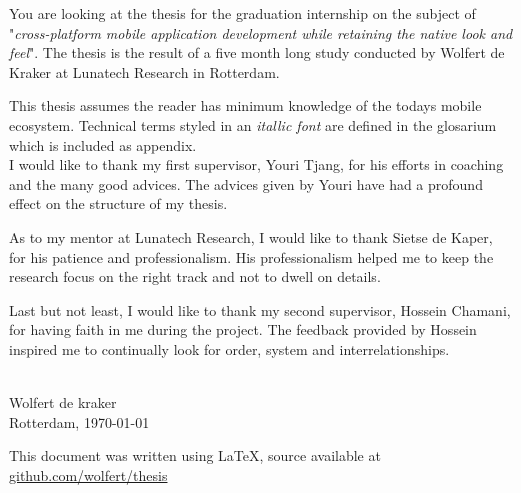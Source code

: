 
You are looking at the thesis for the graduation internship on the subject of "\emph{cross-platform mobile application development while retaining the native look and feel}". The thesis is the result of a five month long study conducted by Wolfert de Kraker at Lunatech Research in Rotterdam.

This thesis assumes the reader has minimum knowledge of the todays mobile ecosystem. Technical terms styled in an \emph{itallic font} are defined in the glosarium which is included as appendix.
~\\

\noindent I would like to thank my first supervisor, Youri Tjang, for his efforts in coaching and the many good advices. The advices given by Youri have had a profound effect on the structure of my thesis.

As to my mentor at Lunatech Research, I would like to thank Sietse de Kaper, for his patience and professionalism. His professionalism helped me to keep the research focus on the right track and not to dwell on details.

Last but not least, I would like to thank my second supervisor, Hossein Chamani, for having faith in me during the project. The feedback provided by Hossein inspired me to continually look for order, system and interrelationships.

~\\

\noindent Wolfert de kraker\\
Rotterdam, \today


\vfill
This document was written using \LaTeX{}, source available at \href{http://github.com/wolfert/thesis}{github.com/wolfert/thesis}